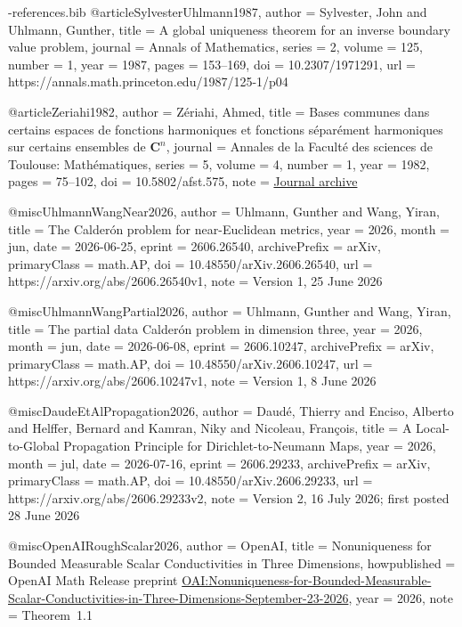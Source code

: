 \documentclass[11pt,a4paper]{article}
\theoremstyle{definition}
\theoremstyle{remark}
\numberwithin{equation}{section}
\begin{document}
\begin{filecontents*}[overwrite]{\jobname-references.bib}
@article{SylvesterUhlmann1987,
  author = {Sylvester, John and Uhlmann, Gunther},
  title = {A global uniqueness theorem for an inverse boundary value problem},
  journal = {Annals of Mathematics},
  series = {2},
  volume = {125},
  number = {1},
  year = {1987},
  pages = {153--169},
  doi = {10.2307/1971291},
  url = {https://annals.math.princeton.edu/1987/125-1/p04}
}

@article{Zeriahi1982,
  author = {Z{\'e}riahi, Ahmed},
  title = {Bases communes dans certains espaces de fonctions harmoniques et fonctions s{\'e}par{\'e}ment harmoniques sur certains ensembles de $\mathbf{C}^n$},
  journal = {Annales de la Facult{\'e} des sciences de Toulouse: Math{\'e}matiques},
  series = {5}, volume = {4}, number = {1}, year = {1982}, pages = {75--102},
  doi = {10.5802/afst.575},
  note = {\href{https://doi.org/10.5802/afst.575}{Journal archive}}
}

@misc{UhlmannWangNear2026,
  author        = {Uhlmann, Gunther and Wang, Yiran},
  title         = {The {Calder{\'o}n} problem for near-{Euclidean} metrics},
  year          = {2026},
  month         = jun,
  date          = {2026-06-25},
  eprint        = {2606.26540},
  archivePrefix = {arXiv},
  primaryClass  = {math.AP},
  doi           = {10.48550/arXiv.2606.26540},
  url           = {https://arxiv.org/abs/2606.26540v1},
  note          = {Version 1, 25 June 2026}
}

@misc{UhlmannWangPartial2026,
  author        = {Uhlmann, Gunther and Wang, Yiran},
  title         = {The partial data {Calder{\'o}n} problem in dimension three},
  year          = {2026},
  month         = jun,
  date          = {2026-06-08},
  eprint        = {2606.10247},
  archivePrefix = {arXiv},
  primaryClass  = {math.AP},
  doi           = {10.48550/arXiv.2606.10247},
  url           = {https://arxiv.org/abs/2606.10247v1},
  note          = {Version 1, 8 June 2026}
}

@misc{DaudeEtAlPropagation2026,
  author        = {Daud{\'e}, Thierry and Enciso, Alberto and Helffer, Bernard
                   and Kamran, Niky and Nicoleau, Fran{\c c}ois},
  title         = {A Local-to-Global Propagation Principle for
                   {Dirichlet-to-Neumann} Maps},
  year          = {2026},
  month         = jul,
  date          = {2026-07-16},
  eprint        = {2606.29233},
  archivePrefix = {arXiv},
  primaryClass  = {math.AP},
  doi           = {10.48550/arXiv.2606.29233},
  url           = {https://arxiv.org/abs/2606.29233v2},
  note          = {Version 2, 16 July 2026; first posted 28 June 2026}
}

@misc{OpenAIRoughScalar2026,
  author = {{OpenAI}},
  title = {{Nonuniqueness for Bounded Measurable Scalar Conductivities in Three Dimensions}},
  howpublished = {OpenAI Math Release preprint
                  \href{https://github.com/openai/math/blob/main/preprints/Nonuniqueness-for-Bounded-Measurable-Scalar-Conductivities-in-Three-Dimensions-September-23-2026/paper.pdf}{OAI:Nonuniqueness-for-Bounded-Measurable-Scalar-Conductivities-in-Three-Dimensions-September-23-2026}},
  year = {2026},
  note = {Theorem~1.1}
}
\end{filecontents*}


\end{document}
